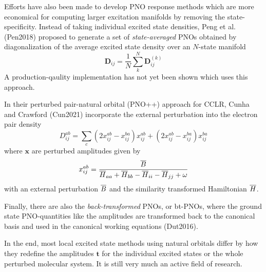 Efforts have also been made to develop PNO response methods which are more economical for computing larger excitation manifolds by removing the state-specificity. Instead of taking individual excited state densities, Peng et al. (Pen2018) proposed to generate a set of \emph{state-averaged} PNOs obtained by diagonalization of the average excited state density over an $N$-state manifold 
\begin{equation}
\mathbf{D}_{ij} = \frac{1}{N} \sum_k^N \mathbf{D}_{ij}^{(k)}
\end{equation}
\noindent A production-qaulity implementation has not yet been shown which uses this approach.

In their perturbed pair-natural orbital (PNO++) approach for CCLR, Cunha and Crawford (Cun2021) incorporate the external perturbation into the electron pair density
\begin{equation}
D_{ij}^{ab} = \sum_c \left( 2x_{ij}^{ab} - x_{ij}^{ba} \right) x_{ij}^{ab} + \left( 2x_{ij}^{ab} - x_{ij}^{ba} \right) x_{ij}^{ba}
\end{equation}
\noindent where $\mathbf{x}$ are perturbed amplitudes given by
\begin{equation}
x_{ij}^{ab} = \frac{\overline{B}}{\overline{H}_{aa} + \overline{H}_{bb} - \overline{H}_{ii} - \overline{H}_{jj} + \omega}
\end{equation}
\noindent with an external perturbation $\overline{B}$ and the similarity transformed Hamiltonian $\overline{H}$. 

Finally, there are also the \emph{back-transformed} PNOs, or bt-PNOs, where the ground state PNO-quantities like the amplitudes are transformed back to the canonical basis and used in the canonical working equations (Dut2016).

In the end, most local excited state methods using natural orbitals differ by how they redefine the amplitudes $\mathbf{t}$ for the individual excited states or the whole perturbed molecular system. It is still very much an active field of research.


